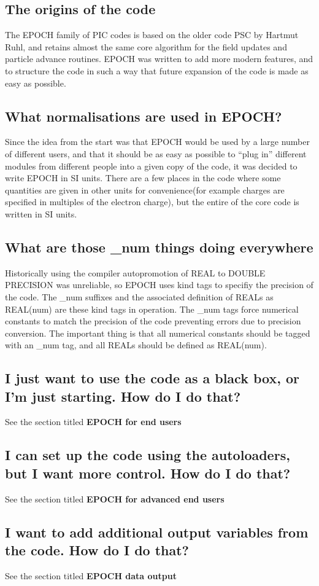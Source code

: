 \documentclass[12pt]{article}
\begin{document}
\subsection{The origins of the code}
The EPOCH family of PIC codes is based on the older code PSC by Hartmut Ruhl, and retains almost the same core algorithm for the field updates and particle advance routines. EPOCH was written to add more modern features, and to structure the code in such a way that future expansion of the code is made as easy as possible.
\subsection{What normalisations are used in EPOCH?}
Since the idea from the start was that EPOCH would be used by a large number of different users, and that it should be as easy as possible to ``plug in'' different modules from different people into a given copy of the code, it was decided to write EPOCH in SI units. There are a few places in the code where some quantities are given in other units for convenience(for example charges are specified in multiples of the electron charge), but the entire of the core code is written in SI units.
\subsection{What are those \_num things doing everywhere}
Historically using the compiler autopromotion of REAL to DOUBLE PRECISION was unreliable, so EPOCH uses kind tags to specifiy the precision of the code. The \_num suffixes and the associated definition of REALs as REAL(num) are these kind tags in operation. The \_num tags force numerical constants to match the precision of the code preventing errors due to precision conversion. The important thing is that all numerical constants should be tagged with an \_num tag, and all REALs should be defined as REAL(num).
\subsection{I just want to use the code as a black box, or I'm just starting. How do I do that?}
See the section titled {\bf EPOCH for end users}
\subsection{I can set up the code using the autoloaders, but I want more control. How do I do that?}
See the section titled {\bf EPOCH for advanced end users}
\subsection{I want to add additional output variables from the code. How do I do that?}
See the section titled {\bf EPOCH data output}
\end{document}
